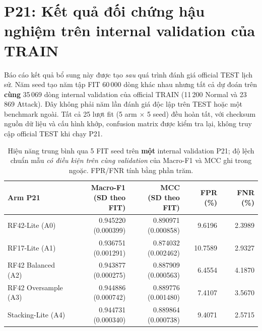 \clearpage
\section{P21: Kết quả đối chứng hậu nghiệm trên internal validation của TRAIN}
\label{sec:p21-results}
Báo cáo kết quả bổ sung này được tạo \emph{sau} quá trình đánh giá official TEST lịch sử. Năm seed tạo năm tập FIT 60\,000 dòng khác nhau nhưng tất cả dự đoán trên \textbf{cùng} 35\,069 dòng internal validation của official TRAIN (11\,200 Normal và 23\,869 Attack). Đây không phải năm lần đánh giá độc lập trên TEST hoặc một benchmark ngoài. Tất cả 25 lượt fit (5 arm $\times$ 5 seed) đều hoàn tất, với checksum nguồn dữ liệu và cấu hình khớp, confusion matrix được kiểm tra lại, không truy cập official TEST khi chạy P21.

\begin{table}[htbp]\centering
\small
\renewcommand{\arraystretch}{1.26}
\setlength{\tabcolsep}{3pt}
\caption{Hiệu năng trung bình qua 5 FIT seed trên \textbf{một} internal validation P21; độ lệch chuẩn mẫu \emph{có điều kiện trên cùng validation} của Macro-F1 và MCC ghi trong ngoặc. FPR/FNR tính bằng phần trăm.}
\label{tab:p21-five-arm-results}
\begin{tabular}{lrrrr}
\toprule
Arm P21 & \shortstack{Macro-F1\\(SD theo FIT)} & \shortstack{MCC\\(SD theo FIT)} & FPR (\%) & FNR (\%)\\\midrule
RF42-Lite (A0) & \shortstack{0.945220\\{\scriptsize (0.000399)}} & \shortstack{0.890971\\{\scriptsize (0.000858)}} & 9.6196 & 2.3989\\
RF17-Lite (A1) & \shortstack{0.936751\\{\scriptsize (0.001291)}} & \shortstack{0.874032\\{\scriptsize (0.002462)}} & 10.7589 & 2.9327\\
RF42 Balanced (A2) & \shortstack{0.943877\\{\scriptsize (0.000275)}} & \shortstack{0.887909\\{\scriptsize (0.000563)}} & 6.4554 & 4.1870\\
RF42 Oversample (A3) & \shortstack{0.944886\\{\scriptsize (0.000742)}} & \shortstack{0.889776\\{\scriptsize (0.001480)}} & 7.4107 & 3.5670\\
Stacking-Lite (A4) & \shortstack{0.944731\\{\scriptsize (0.000340)}} & \shortstack{0.889864\\{\scriptsize (0.000738)}} & 9.4071 & 2.5715\\\bottomrule
\end{tabular}
\vspace{3pt}


\end{table}
